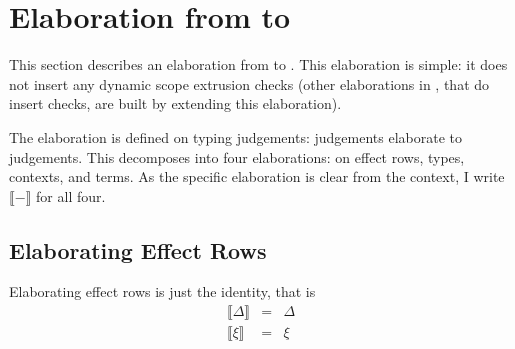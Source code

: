 \section{Elaboration from \texorpdfstring{\sourceLang{}}{Lambda-Op-Quote-Splice} to \texorpdfstring{\coreLang{}}{Lambda-Op-AST}}\label{section:elaboration}
This section describes an elaboration from \sourceLang{} to \coreLang{}. This elaboration is simple: it does not insert any dynamic scope extrusion checks (other elaborations in , that do insert checks, are built by extending this elaboration).

\newcommand{\elaborate}[1]{\llbracket #1 \rrbracket}
\newcommand{\erase}[1]{\textsf{erase}(#1)}
\newcommand{\AST}[1]{\textsf{AST}(#1)}
\newcommand{\Code}[1]{\textsf{Code}(#1)}


The elaboration is defined on typing judgements: \sourceLang{} judgements elaborate to \coreLang{} judgements. This decomposes into four elaborations: on effect rows, types, contexts, and terms. As the specific elaboration is clear from the context, I write $\llbracket - \rrbracket$ for all four.

\subsection{Elaborating Effect Rows}
Elaborating effect rows is just the identity, that is 
\[\begin{array}{rcl}
  \elaborate{\Delta} &=& \Delta \\
  \elaborate{\xi}&=&{\xi}
\end{array}\]

